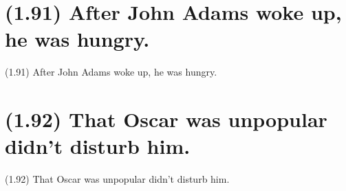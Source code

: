 \documentclass{article}
\begin{document}
\clearpage

%
%

\section*{(1.91) After John Adams woke up, he was hungry.}

\bigbreak
\begin{enumerate*}
\item[(1.91)] After John Adams woke up, he was hungry.
\end{enumerate*}
\bigbreak

\bigbreak
\begin{minipage}{\textwidth}
\end{minipage}
\bigbreak

\clearpage

%
%

\section*{(1.92) That Oscar was unpopular didn't disturb him.}

\bigbreak
\begin{enumerate*}
\item[(1.92)] That Oscar was unpopular didn't disturb him.
\end{enumerate*}
\bigbreak

\bigbreak
\begin{minipage}{\textwidth}
\end{minipage}
\bigbreak
\end{document}
